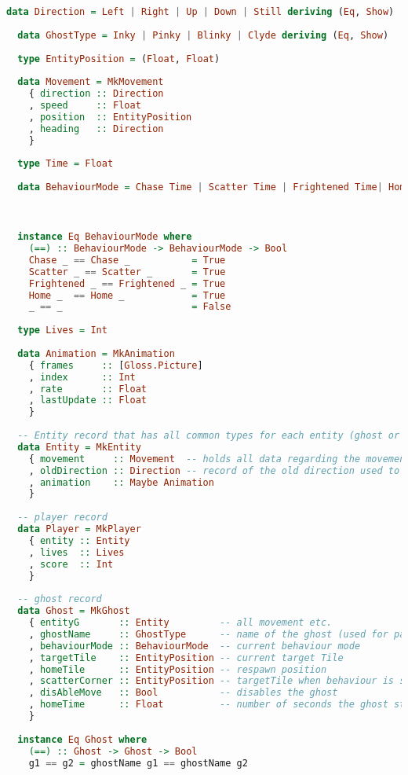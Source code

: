 \documentclass[11pt]{Article}
\begin{document}

\begin{lstlisting}[language=Haskell]
  data Direction = Left | Right | Up | Down | Still deriving (Eq, Show)
  
  data GhostType = Inky | Pinky | Blinky | Clyde deriving (Eq, Show)
  
  type EntityPosition = (Float, Float)
  
  data Movement = MkMovement
    { direction :: Direction
    , speed     :: Float
    , position  :: EntityPosition
    , heading   :: Direction
    }
  
  type Time = Float
  
  data BehaviourMode = Chase Time | Scatter Time | Frightened Time| Home Time deriving (Show)
  


  instance Eq BehaviourMode where
    (==) :: BehaviourMode -> BehaviourMode -> Bool
    Chase _ == Chase _           = True
    Scatter _ == Scatter _       = True
    Frightened _ == Frightened _ = True
    Home _  == Home _            = True
    _ == _                       = False
  
  type Lives = Int
  
  data Animation = MkAnimation
    { frames     :: [Gloss.Picture]
    , index      :: Int
    , rate       :: Float
    , lastUpdate :: Float
    }
  
  -- Entity record that has all common types for each entity (ghost or player)
  data Entity = MkEntity
    { movement     :: Movement  -- holds all data regarding the movement
    , oldDirection :: Direction -- record of the old direction used to differntiate between heading and direction
    , animation    :: Maybe Animation
    }
  
  -- player record
  data Player = MkPlayer
    { entity :: Entity
    , lives  :: Lives
    , score  :: Int
    }
  
  -- ghost record
  data Ghost = MkGhost
    { entityG       :: Entity         -- all movement etc.
    , ghostName     :: GhostType      -- name of the ghost (used for patternmatch and debug)
    , behaviourMode :: BehaviourMode  -- current behaviour mode
    , targetTile    :: EntityPosition -- current target Tile
    , homeTile      :: EntityPosition -- respawn position
    , scatterCorner :: EntityPosition -- targetTile when behaviour is scatter
    , disAbleMove   :: Bool           -- disables the ghost
    , homeTime      :: Float          -- number of seconds the ghost stays in home after being eaten
    }
  
  instance Eq Ghost where
    (==) :: Ghost -> Ghost -> Bool
    g1 == g2 = ghostName g1 == ghostName g2
\end{lstlisting}
\end{document}
